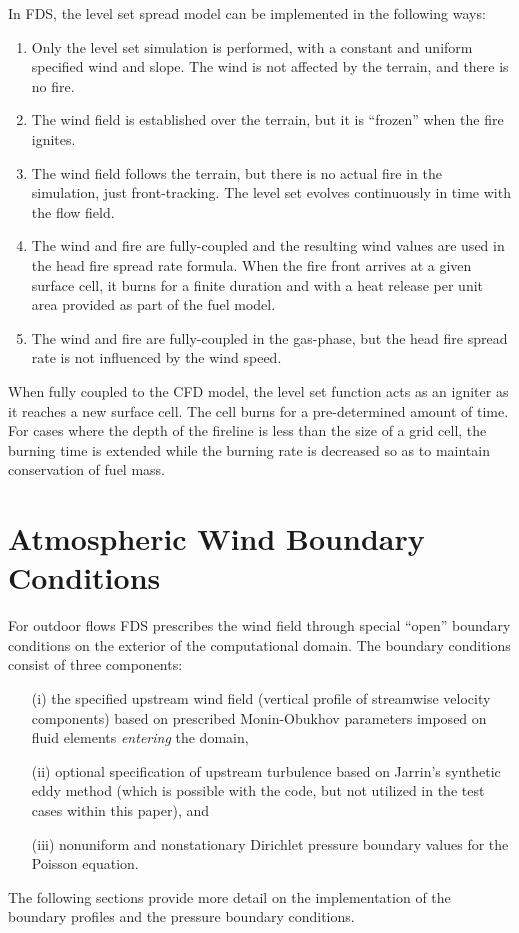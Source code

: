 \documentclass[journal,article,atmosphere,submit,moreauthors,pdftex]{Definitions/mdpi}
\begin{document}
In FDS, the level set spread model can be implemented in the following ways:
\begin{enumerate}
\item Only the level set simulation is performed, with a constant and uniform specified wind and slope. The wind is not affected by the terrain, and there is no fire.
\item The wind field is established over the terrain, but it is ``frozen'' when the fire ignites.
\item The wind field follows the terrain, but there is no actual fire in the simulation, just front-tracking.  The level set evolves continuously in time with the flow field.
\item The wind and fire are fully-coupled and the resulting wind values are used in the head fire spread rate formula. When the fire front arrives at a given surface cell, it burns for a finite duration and with a heat release per unit area provided as part of the fuel model.
\item The wind and fire are fully-coupled in the gas-phase, but the head fire spread rate is not influenced by the wind speed. 
\end{enumerate}
When fully coupled to the CFD model, the level set function acts as an igniter as it reaches a new surface cell. The cell burns for a pre-determined amount of time. For cases where the depth of the fireline is less than the size of a grid cell, the burning time is extended while the burning rate is decreased so as to maintain conservation of fuel mass.



\section{Atmospheric Wind Boundary Conditions}
\label{sec:wind}

For outdoor flows FDS prescribes the wind field through special ``open'' boundary conditions on the exterior of the computational domain.  The boundary conditions consist of three components:
\begin{enumerate}
\item[(i)] the specified upstream wind field (vertical profile of streamwise velocity components) based on prescribed Monin-Obukhov parameters imposed on fluid elements \emph{entering} the domain,
\item[(ii)] optional specification of upstream turbulence based on Jarrin's synthetic eddy method \cite{Jarrin:2008} (which is possible with the code, but not utilized in the test cases within this paper), and
\item[(iii)] nonuniform and nonstationary Dirichlet pressure boundary values for the Poisson equation.
\end{enumerate}
The following sections provide more detail on the implementation of the boundary profiles and the pressure boundary conditions.
\end{document}

